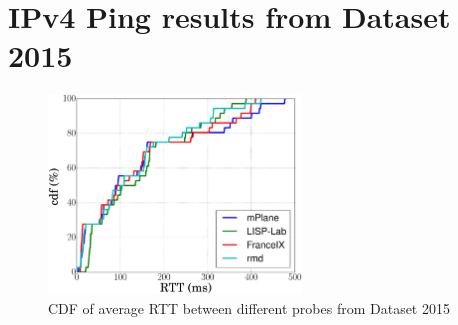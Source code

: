 \section{IPv4 Ping results from Dataset 2015}
\label{sec:pxtr_ping_v4_2015}
    \begin{figure}[!t]
     	\centering
     	\includegraphics[width=0.6\textwidth]{Pics/2015/CDF_RTT_avg.eps}
     	\caption{CDF of average RTT between different probes from Dataset 2015}
     	\label{CDF_RTT_avg_v4_2015}
     \end{figure}
    
